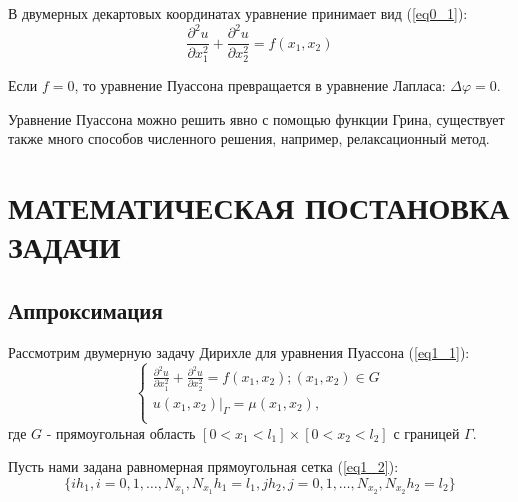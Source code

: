 \documentclass[a4paper, 14pt]{extreport}
\begin{document}
	В двумерных декартовых координатах уравнение принимает вид (\ref{eq0_1}): 
	\begin{equation}\label{eq0_1} 
		\frac{\partial^2 u}{\partial x_1^2} + \frac{\partial^2 u}{\partial x_2^2} = f(x_1, x_2)
	\end{equation}
	
	Если $f=0$, то уравнение Пуассона превращается в уравнение Лапласа: $\Delta\varphi=0$.
	
	Уравнение Пуассона можно решить явно с помощью функции Грина, существует также много способов численного решения, например, релаксационный метод.
	\chapter{МАТЕМАТИЧЕСКАЯ ПОСТАНОВКА ЗАДАЧИ}
	\vspace{1.1cm}
	\section{Аппроксимация}
	Рассмотрим двумерную задачу Дирихле для уравнения Пуассона (\ref{eq1_1}):
	\begin{equation}\label{eq1_1}
		\begin{cases}
			\frac{\partial^2 u}{\partial x_1^2} + \frac{\partial^2 u}{\partial x_2^2} = f(x_1, x_2); (x_1, x_2) \in G \\
			u(x_1, x_2)|_\Gamma = \mu(x_1, x_2), \\
		\end{cases}
	\end{equation}
	где $G$ - прямоугольная область $[0<x_1<l_1]\times[0<x_2<l_2]$ с границей $\Gamma$.
	
	Пусть нами задана равномерная прямоугольная сетка (\ref{eq1_2}):
	\begin{equation}\label{eq1_2} 
		\{ih_1,i=0,1,\dots,N_{x_1}, N_{x_1}h_1=l_1, jh_2, j=0,1,\dots,N_{x_2}, N_{x_2}h_2=l_2\}
	\end{equation}
	
\end{document}
